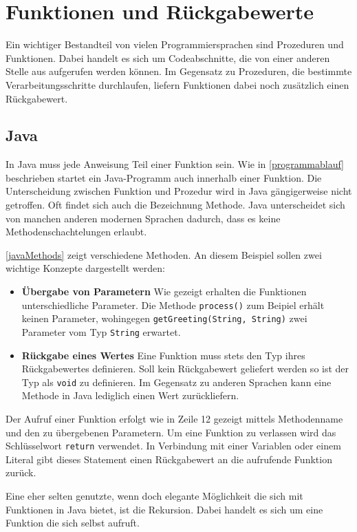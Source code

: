 \section{Funktionen und Rückgabewerte}\label{sec:functionsAndReturnValues}
Ein wichtiger Bestandteil von vielen Programmiersprachen sind Prozeduren und Funktionen. Dabei handelt es sich um Codeabschnitte, die von einer anderen Stelle aus aufgerufen werden können. Im Gegensatz zu Prozeduren, die bestimmte Verarbeitungsschritte durchlaufen, liefern Funktionen dabei noch zusätzlich einen Rückgabewert.

\subsection*{Java}
In Java muss jede Anweisung Teil einer Funktion sein. Wie in \autoref{programmablauf} beschrieben startet ein Java-Programm auch innerhalb einer Funktion. Die Unterscheidung zwischen Funktion und Prozedur wird in Java gängigerweise nicht getroffen. Oft findet sich auch die Bezeichnung Methode. Java unterscheidet sich von manchen anderen modernen Sprachen dadurch, dass es keine Methodenschachtelungen erlaubt.

\autoref{javaMethods} zeigt verschiedene Methoden. An diesem Beispiel sollen zwei wichtige Konzepte dargestellt werden: 
\begin{itemize}
    \item \textbf{Übergabe von Parametern}
    Wie gezeigt erhalten die Funktionen unterschiedliche Parameter. Die Methode \texttt{process()} zum Beipiel erhält keinen Parameter, wohingegen \texttt{getGreeting(String, String)} zwei Parameter vom Typ \texttt{String} erwartet.
    \item \textbf{Rückgabe eines Wertes}
    Eine Funktion muss stets den Typ ihres Rückgabewertes definieren. Soll kein Rückgabewert geliefert werden so ist der Typ als \texttt{void} zu definieren. Im Gegensatz zu anderen Sprachen kann eine Methode in Java lediglich einen Wert zurückliefern.
\end{itemize}
Der Aufruf einer Funktion erfolgt wie in Zeile 12 gezeigt mittels Methodenname und den zu übergebenen Parametern. Um eine Funktion zu verlassen wird das Schlüsselwort \texttt{return} verwendet. In Verbindung mit einer Variablen oder einem Literal gibt dieses Statement einen Rückgabewert an die aufrufende Funktion zurück.

Eine eher selten genutzte, wenn doch elegante Möglichkeit die sich mit Funktionen in Java bietet, ist die Rekursion. Dabei handelt es sich um eine Funktion die sich selbst aufruft. 

